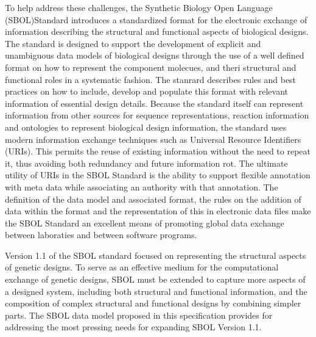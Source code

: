 To help address these challenges, the Synthetic Biology Open Language (SBOL)Standard introduces a standardized format for the electronic exchange of information describing the structural and functional aspects of biological designs. The standard is designed to support the development of explicit and unambiguous data models of biological designs through the use of a well defined format on how to represent the component molecues, and theri structural and functional roles in a systematic fashion. The stanrard describes rules and best practices on how to include, develop and populate this format with relevant information of essential design details. Because the standard itself can represent information from other sources for sequence representations, reaction information and ontologies to represent biological design information, the standard uses modern information exchange techniques such as Universal Resource Identifiers (URIs). This permits the reuse of existing information without the need to repeat it, thus avoiding both redundancy and future information rot. The ultimate utility of URIs in the SBOL Standard is the ability to support flexible annotation with meta data while associating an authority with that annotation. The definition of the data model and associated format, the rules on the addition of data within the format and the representation of this in electronic data files make the SBOL Standard an excellent means of promoting global data exchange between laboraties and between software programs.



Version 1.1 of the SBOL standard focused on representing the structural aspects of genetic designs. To serve as an effective medium for the computational exchange of genetic designs, SBOL must be extended to capture more aspects of a designed system, including both structural and functional information, and the composition of complex structural and functional designs by combining simpler parts. The SBOL data model proposed in this specification provides for addressing the most pressing needs for expanding SBOL Version 1.1. 

